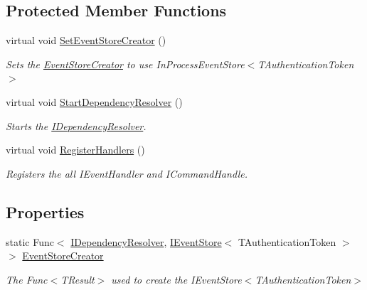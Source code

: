 \subsection*{Protected Member Functions}
\begin{DoxyCompactItemize}
\item 
virtual void \hyperlink{classCqrs_1_1Configuration_1_1SampleRuntime_a08ac580aad6ab03f16fd3171f21dfe59_a08ac580aad6ab03f16fd3171f21dfe59}{Set\+Event\+Store\+Creator} ()
\begin{DoxyCompactList}\small\item\em Sets the \hyperlink{classCqrs_1_1Configuration_1_1SampleRuntime_a9038dd478bcafb2f5f65cbcbada712db_a9038dd478bcafb2f5f65cbcbada712db}{Event\+Store\+Creator} to use In\+Process\+Event\+Store$<$\+T\+Authentication\+Token$>$ \end{DoxyCompactList}\item 
virtual void \hyperlink{classCqrs_1_1Configuration_1_1SampleRuntime_a1593df9e75becc36fee1f15b2be14ec4_a1593df9e75becc36fee1f15b2be14ec4}{Start\+Dependency\+Resolver} ()
\begin{DoxyCompactList}\small\item\em Starts the \hyperlink{interfaceCqrs_1_1Configuration_1_1IDependencyResolver}{I\+Dependency\+Resolver}. \end{DoxyCompactList}\item 
virtual void \hyperlink{classCqrs_1_1Configuration_1_1SampleRuntime_a001d4810823f11dee9144834182f8e05_a001d4810823f11dee9144834182f8e05}{Register\+Handlers} ()
\begin{DoxyCompactList}\small\item\em Registers the all I\+Event\+Handler and I\+Command\+Handle. \end{DoxyCompactList}\end{DoxyCompactItemize}
\subsection*{Properties}
\begin{DoxyCompactItemize}
\item 
static Func$<$ \hyperlink{interfaceCqrs_1_1Configuration_1_1IDependencyResolver}{I\+Dependency\+Resolver}, \hyperlink{interfaceCqrs_1_1Events_1_1IEventStore}{I\+Event\+Store}$<$ T\+Authentication\+Token $>$ $>$ \hyperlink{classCqrs_1_1Configuration_1_1SampleRuntime_a9038dd478bcafb2f5f65cbcbada712db_a9038dd478bcafb2f5f65cbcbada712db}{Event\+Store\+Creator}
\begin{DoxyCompactList}\small\item\em The Func$<$\+T\+Result$>$ used to create the I\+Event\+Store$<$\+T\+Authentication\+Token$>$ \end{DoxyCompactList}\end{DoxyCompactItemize}


